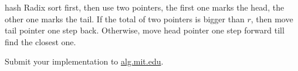 \documentclass[12pt,twoside]{article}
\begin{document}
\begin{problems}
\newpage

\problem  %

\begin{problemparts}
\problempart %
hash
\problempart %
Radix sort first, then use two pointers, the first one marks the head, the other one marks the tail.
If the total of two pointers is bigger than $r$, then move tail pointer one step back.
Otherwise, move head pointer one step forward till find the closest one.
\end{problemparts}

\newpage

\problem  %

\begin{problemparts}
\problempart %

\problempart %
\problempart Submit your implementation to {\small\url{alg.mit.edu}}.
\end{problemparts}

\end{problems}
\end{document}
